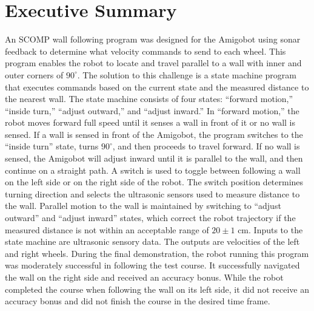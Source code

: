 \section{Executive Summary}

An SCOMP wall following program was designed for the Amigobot
using sonar feedback to determine what velocity commands to send to
each wheel. This program enables the robot to locate and travel
parallel to a wall with inner and outer corners of \(90^\circ\). The
solution to this challenge is a state machine program that executes
commands based on the current state and the measured distance to the
nearest wall. The state machine consists of four states: ``forward
motion,'' ``inside turn,'' ``adjust outward,'' and ``adjust inward.''
In ``forward motion,'' the robot moves forward full speed until it senses a
wall in front of it or no wall is sensed. If a wall is sensed in front
of the Amigobot, the program switches to the ``inside turn'' state,
turns \(90^\circ\), and then proceeds to travel forward. If no wall is
sensed, the Amigobot will adjust inward until it is parallel to the
wall, and then continue on a straight path. A switch is used to toggle
between following a wall on the left side or on the right side of the
robot. The switch position determines turning direction and selects
the ultrasonic sensors used to measure distance to the wall. Parallel motion to
the wall is maintained by switching to ``adjust outward'' and ``adjust
inward'' states, which correct the robot trajectory if the measured
distance is not within an acceptable range of \(20\pm1\) cm. Inputs to
the state machine are ultrasonic sensory data. The outputs are
velocities of the left and right
wheels. During the final demonstration, the robot running this program
was moderately successful in following the test course. It
successfully navigated the wall on the right side and received an
accuracy bonus. While the robot completed the course when following
the wall on its left side, it did not receive an accuracy bonus and
did not finish the course in the desired time frame.


